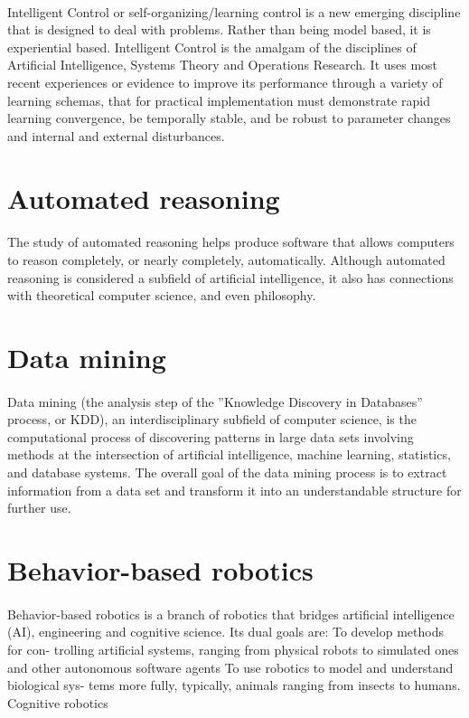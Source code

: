 \documentclass[12pt]{report}
\begin{document}
\paragraph{} Intelligent Control or self-organizing/learning control is a new emerging
discipline that is designed to deal with problems. Rather than being model based, it is experiential
based. Intelligent Control is the amalgam of the disciplines of Artificial Intelligence, Systems
Theory and Operations Research. It uses most recent experiences or evidence to improve its
performance through a variety of learning schemas, that for practical implementation must
demonstrate rapid learning convergence, be temporally stable, and be robust to parameter changes
and internal and external disturbances.
\section{Automated reasoning}
\paragraph{} The study of automated reasoning helps produce software that allows
computers to reason completely, or nearly completely, automatically. Although automated
reasoning is considered a subfield of artificial intelligence, it also has connections with theoretical
computer science, and even philosophy.
\section{Data mining}
\paragraph{} Data mining (the analysis step of the ”Knowledge Discovery in Databases”
process, or KDD), an interdisciplinary subfield of computer science, is the computational process
of discovering patterns in large data sets involving methods at the intersection of artificial
intelligence, machine learning, statistics, and database systems. The overall goal of the data
mining process is to extract information from a data set and transform it into an understandable
structure for further use.
\section{Behavior-based robotics}
\paragraph{} Behavior-based robotics is a branch of robotics that bridges artificial
intelligence (AI), engineering and cognitive science. Its dual goals are: To develop methods for
con- trolling artificial systems, ranging from physical robots to simulated ones and other
autonomous software agents To use robotics to model and understand biological sys- tems more
fully, typically, animals ranging from insects to humans. Cognitive robotics
\end{document}
